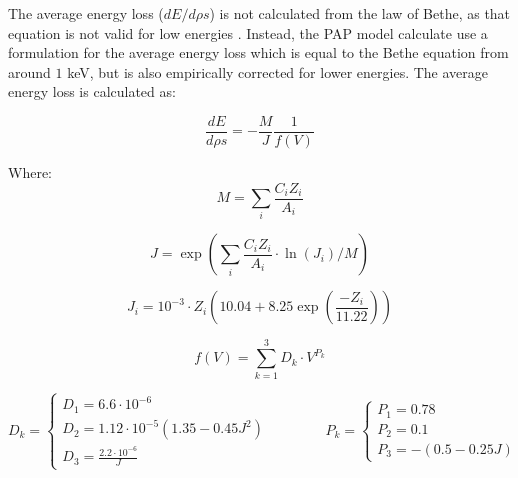 The average energy loss ($dE/d\rho s$) is not calculated from the law of Bethe, as that equation is not valid for low energies \cite{inokuti_on_bethe_1971,pap_1991}.
Instead, the PAP model calculate use a formulation for the average energy loss which is equal to the Bethe equation from around $1$ keV, but is also empirically corrected for lower energies.
The average energy loss is calculated as:


\begin{equation}
    \frac{dE}{d\rho s} = - \frac{M}{J} \frac{1}{f(V)}
\end{equation}

Where:
\begin{equation}
    M = \sum \limits_{i} \frac{C_i Z_i}{A_i}
\end{equation}

\begin{equation}
    J = \exp(\sum \limits_{i} \frac{C_i Z_i}{A_i} \cdot \ln(J_i)/M)
\end{equation}

\begin{equation}
    J_i = 10^{-3} \cdot Z_i (10.04 + 8.25 \exp(\frac{-Z_i}{11.22}))
\end{equation}

\begin{equation}
    f(V) = \sum \limits_{k=1}^{3} D_k \cdot V^{P_k}
\end{equation}



\begin{equation}
    D_k = \begin{cases}
        D_1 = 6.6 \cdot 10^{-6}                                 \\
        D_2 = 1.12 \cdot 10^{-5}(1.35 - 0.45 J^2) \qquad \qquad \\
        D_3 = \frac{2.2 \cdot 10^{-6}}{J}
    \end{cases}
    P_k = \begin{cases}
        P_1 =  0.78 \\
        P_2 = 0.1   \\
        P_3 =  -(0.5-0.25J)
    \end{cases}
\end{equation}

